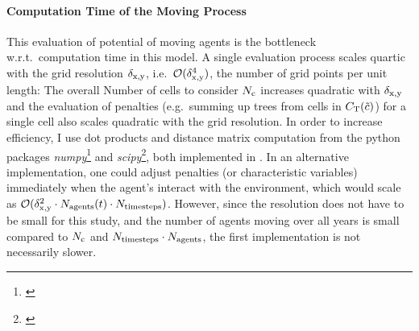 \paragraph{Computation Time of the Moving Process}
This evaluation of potential of moving agents is the bottleneck w.r.t.\ computation time in this model.
A single evaluation process scales quartic with the grid resolution $\delta_{\rm x,y}$, i.e.\ $\mathcal{O}(\delta_{\rm x,y}^4)$, the number of grid points per unit length: The overall Number of cells to consider $N_{\rm c}$ increases quadratic with $\delta_{\rm x,y}$ and the evaluation of penalties (e.g.\ summing up trees from cells in $C_{\rm T}(\tilde{c})$) for a single cell also scales quadratic with the grid resolution.
In order to increase efficiency, I use dot products and distance matrix computation from the python packages \textit{numpy}\footnote{\citet{numpy}} and \textit{scipy}\footnote{\citet{scipy}}, both implemented in \CC.
In an alternative implementation, one could adjust penalties (or characteristic variables) immediately when the agent's interact with the environment, which would scale as $\mathcal{O}(\delta_{\rm x,y}^2\cdot N_{\rm agents}(t)\cdot N_{\rm timesteps})$.
However, since the resolution does not have to be small for this study, and the number of agents moving over all years is small compared to $N_{\rm c}$ and $N_{\rm timesteps} \cdot N_{\rm agents}$, the first implementation is not necessarily slower.
	
		
		

















